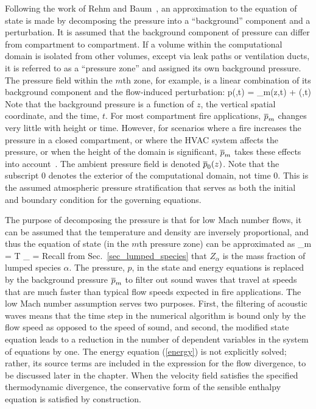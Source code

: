 Following the work of Rehm and Baum~\cite{Rehm:1}, an approximation to the equation of state is made by decomposing the pressure
into a ``background'' component and a perturbation. It is assumed that
the background component of pressure can differ from compartment to compartment. If
a volume within the computational domain is isolated from other volumes, except via leak paths or ventilation ducts, it is referred to as a ``pressure zone'' and assigned its own background pressure. The pressure field within the $m$th zone, for example, is a linear combination
of its background component and the flow-induced perturbation:
\be
   p(\bx,t) = \bp_m(z,t) + \tp(\bx,t)
\ee
Note that the background pressure is a function of $z$, the vertical spatial coordinate, and the time, $t$. For most compartment fire applications, $\overline{p}_m$ changes very little with height or time. However, for scenarios where a fire increases the pressure in a closed compartment, or where the HVAC system affects the pressure, or when the height of the domain is significant, $\overline{p}_m$ takes these effects into account~\cite{Baum:5}. The ambient pressure field is denoted $\overline{p}_0(z)$. Note that the subscript 0 denotes the exterior of the computational domain, not time 0. This is the assumed atmospheric pressure stratification that serves as both the initial and boundary condition for the governing equations.

The purpose of decomposing the pressure is that for low Mach number flows, it can be assumed that the temperature and density are inversely proportional, and thus the equation of state (in the $m$th pressure zone) can be approximated as
\be
   \bp_m  =  \rho T \R \sum_\alpha {} =   \label{state}
\ee
Recall from Sec.~\ref{sec_lumped_species} that $Z_\alpha$ is the mass fraction of lumped species $\alpha$. The pressure, $p$, in the state and energy equations is replaced by the background pressure $\overline{p}_m$ to filter out sound waves that travel at speeds that are much faster than typical flow speeds expected in fire applications. The low Mach number assumption serves two purposes. First, the filtering of acoustic waves means that the time step in the numerical algorithm is bound only by the flow speed as opposed to the speed of sound, and second, the modified state equation leads to a reduction in the number of dependent variables in the system of equations by one. The energy equation (\ref{energy}) is not explicitly solved; rather, its source terms are included in the expression for the flow divergence, to be discussed later in the chapter.  When the velocity field satisfies the specified thermodynamic divergence, the conservative form of the sensible enthalpy equation is satisfied by construction.


